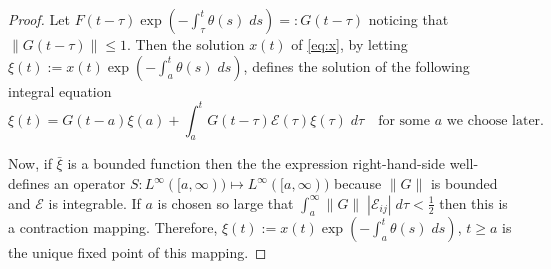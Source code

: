 \documentclass[a4paper,11pt]{article}
\theoremstyle{remark}
\begin{document}
\begin{proof}
 Let $F(t-\tau)\exp\left(-\int_\tau^t \theta(s)\; ds\right)=:G(t-\tau)$ noticing that $\|G(t-\tau)\|\le 1$.
Then the solution $x(t)$ of \eqref{eq:x}, by letting $\xi(t):=x(t)\exp\left(-\int_a^t \theta(s)\; ds\right)$, defines the solution of the following integral equation  $$ \xi(t) = G(t-a)\xi(a) + \int_a^t G(t-\tau)\mathcal{E}(\tau)\xi(\tau) \; d\tau \quad \text{for some $a$ we choose later.}$$ 


 Now, if $\bar\xi$ is a bounded function then the the expression right-hand-side well-defines an operator $S:L^\infty([a,\infty)) \mapsto L^\infty([a,\infty))$ because $\|G\|$ is bounded and $\mathcal{E}$ is integrable. If $a$ is chosen so large that $\int_a^\infty \|G\| \; |\mathcal{E}_{ij}|\; d\tau < \frac{1}{2}$ then this is a contraction mapping. Therefore, $\xi(t):=x(t)\exp\left(-\int_a^t \theta(s)\; ds\right)$, $t\ge a$ is the unique fixed point of this mapping.
%  
%  
 

\end{proof}
\end{document}
